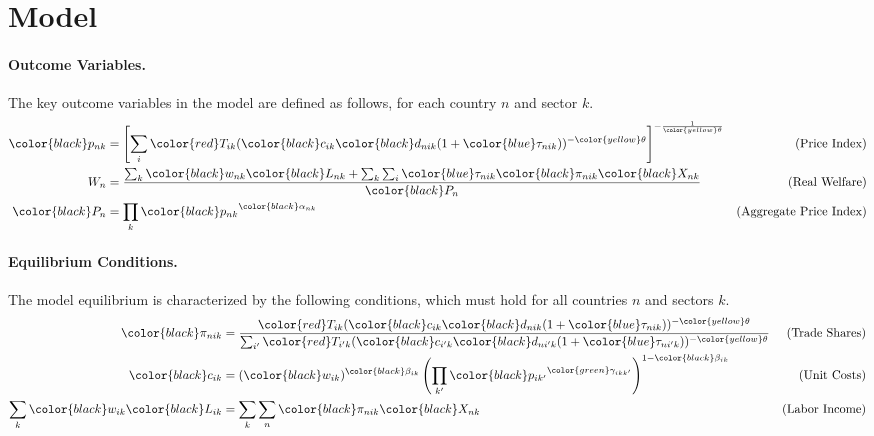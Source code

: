\section{Model}
\paragraph{Outcome Variables.} The key outcome variables in the model are defined as follows, for each country $n$ and sector $k$.
\begin{align*}
    {\color{black}p_{nk}} &= \left[ \sum_{i} {\color{red}T_{ik}} ({\color{black}c_{ik}} {\color{black}d_{nik}} (1 + {\color{blue}\tau_{nik}}))^{-{\color{yellow}\theta}} \right]^{-\frac{1}{{\color{yellow}\theta}}} & \text{(Price Index)} \\
    W_n &= \frac{\sum_{k} {\color{black}w_{nk}} {\color{black}L_{nk}} + \sum_{k} \sum_{i} {\color{blue}\tau_{nik}} {\color{black}\pi_{nik}} {\color{black}X_{nk}}}{{\color{black}P_n}} & \text{(Real Welfare)} \\
    {\color{black}P_n} &= \prod_{k} {\color{black}p_{nk}}^{{\color{black}\alpha_{nk}}} & \text{(Aggregate Price Index)}
\end{align*}

\paragraph{Equilibrium Conditions.} The model equilibrium is characterized by the following conditions, which must hold for all countries $n$ and sectors $k$.
\begin{align*}
    {\color{black}\pi_{nik}} &= \frac{{\color{red}T_{ik}} ({\color{black}c_{ik}} {\color{black}d_{nik}} (1 + {\color{blue}\tau_{nik}}))^{-{\color{yellow}\theta}}}{\sum_{i'} {\color{red}T_{i'k}} ({\color{black}c_{i'k}} {\color{black}d_{ni'k}} (1 + {\color{blue}\tau_{ni'k}}))^{-{\color{yellow}\theta}}} & \text{(Trade Shares)} \\
    {\color{black}c_{ik}} &= ({\color{black}w_{ik}})^{{\color{black}\beta_{ik}}} \left(\prod_{k'} {\color{black}p_{ik'}}^{{\color{green}\gamma_{ikk'}}}\right)^{1 - {\color{black}\beta_{ik}}} & \text{(Unit Costs)} \\
   \sum_{k} {\color{black}w_{ik}} {\color{black}L_{ik}} &= \sum_{k} \sum_{n} {\color{black}\pi_{nik}} {\color{black}X_{nk}} & \text{(Labor Income)}
\end{align*}

